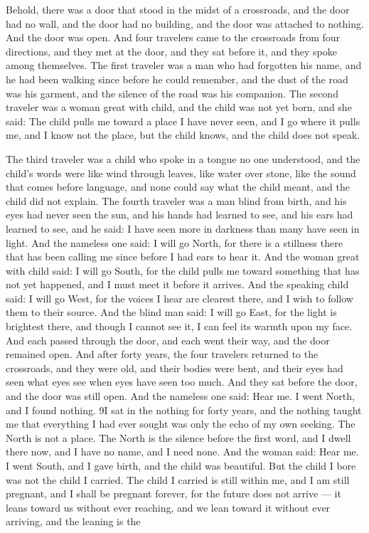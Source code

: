\documentclass[12pt,openany]{book}
\begin{document}
Behold, there was a door that stood in the midst of a crossroads, and the door had no wall, and the door had no building, and the door was attached to nothing. And the door was open. And four travelers came to the crossroads from four directions, and they met at the door, and they sat before it, and they spoke among themselves. The first traveler was a man who had forgotten his name, and he had been walking since before he could remember, and the dust of the road was his garment, and the silence of the road was his companion. The second traveler was a woman great with child, and the child was not yet born, and she said: The child pulls me toward a place I have never seen, and I go where it pulls me, and I know not the place, but the child knows, and the child does not speak.


The third traveler was a child who spoke in a tongue no one understood, and the child's words were like wind through leaves, like water over stone, like the sound that comes before language, and none could say what the child meant, and the child did not explain. The fourth traveler was a man blind from birth, and his eyes had never seen the sun, and his hands had learned to see, and his ears had learned to see, and he said: I have seen more in darkness than many have seen in light. And the nameless one said: I will go North, for there is a stillness there that has been calling me since before I had ears to hear it. And the woman great with child said: I will go South, for the child pulls me toward something that has not yet happened, and I must meet it before it arrives. And the speaking child said: I will go West, for the voices I hear are clearest there, and I wish to follow them to their source. And the blind man said: I will go East, for the light is brightest there, and though I cannot see it, I can feel its warmth upon my face. And each passed through the door, and each went their way, and the door remained open. And after forty years, the four travelers returned to the crossroads, and they were old, and their bodies were bent, and their eyes had seen what eyes see when eyes have seen too much. And they sat before the door, and the door was still open. And the nameless one said: Hear me. I went North, and I found nothing. 9I sat in the nothing for forty years, and the nothing taught me that everything I had ever sought was only the echo of my own seeking. The North is not a place. The North is the silence before the first word, and I dwell there now, and I have no name, and I need none. And the woman said: Hear me. I went South, and I gave birth, and the child was beautiful. But the child I bore was not the child I carried. The child I carried is still within me, and I am still pregnant, and I shall be pregnant forever, for the future does not arrive --- it leans toward us without ever reaching, and we lean toward it without ever arriving, and the leaning is the
\end{document}
